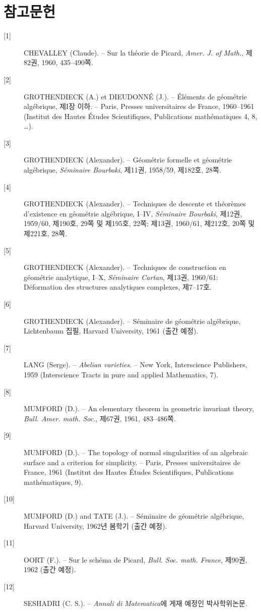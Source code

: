 \documentclass[11pt,twoside,openany]{book}
\numberwithin{equation}{section}
\theoremstyle{plain}
\theoremstyle{definition}
\theoremstyle{remark}
\begin{document}
\section*{참고문헌}

\begin{description}
\item[{[1]}] CHEVALLEY (Claude). -- Sur la théorie de Picard,
\emph{Amer. J. of Math.}, 제82권, 1960, 435--490쪽.

\item[{[2]}] GROTHENDIECK (A.) et DIEUDONNÉ (J.). -- Éléments de géométrie
algébrique, 제I장 이하. -- Paris, Presses universitaires de France,
1960--1961 (Institut des Hautes Études Scientifiques, Publications
mathématiques 4, 8, \ldots).

\item[{[3]}] GROTHENDIECK (Alexander). -- Géométrie formelle et géométrie
algébrique, \emph{Séminaire Bourbaki}, 제11권, 1958/59,
제182호, 28쪽.

\item[{[4]}] GROTHENDIECK (Alexander). -- Techniques de descente et théorèmes
d'existence en géométrie algébrique, I--IV, \emph{Séminaire Bourbaki}, 제12권,
1959/60, 제190호, 29쪽 및 제195호, 22쪽; 제13권, 1960/61, 제212호, 20쪽 및
제221호, 28쪽.

\item[{[5]}] GROTHENDIECK (Alexander). -- Techniques de construction en
géométrie analytique, I--X, \emph{Séminaire Cartan}, 제13권, 1960/61:
Déformation des structures analytiques complexes, 제7--17호.

\item[{[6]}] GROTHENDIECK (Alexander). -- Séminaire de géométrie algébrique,
Lichtenbaum 집필, Harvard University, 1961 (출간 예정).

\item[{[7]}] LANG (Serge). -- \emph{Abelian varieties}. -- New York,
Interscience Publishers, 1959 (Interscience Tracts in pure and applied
Mathematics, 7).

\item[{[8]}] MUMFORD (D.). -- An elementary theorem in geometric invariant
theory, \emph{Bull. Amer. math. Soc.}, 제67권, 1961, 483--486쪽.

\item[{[9]}] MUMFORD (D.). -- The topology of normal singularities of an
algebraic surface and a criterion for simplicity. -- Paris, Presses
universitaires de France, 1961 (Institut des Hautes Études Scientifiques,
Publications mathématiques, 9).

\item[{[10]}] MUMFORD (D.) and TATE (J.). -- Séminaire de géométrie
algébrique, Harvard University, 1962년 봄학기 (출간 예정).

\item[{[11]}] OORT (F.). -- Sur le schéma de Picard,
\emph{Bull. Soc. math. France}, 제90권, 1962 (출간 예정).

\item[{[12]}] SESHADRI (C. S.). -- \emph{Annali di Matematica}에 게재 예정인
박사학위논문.
\end{description}
\end{document}
